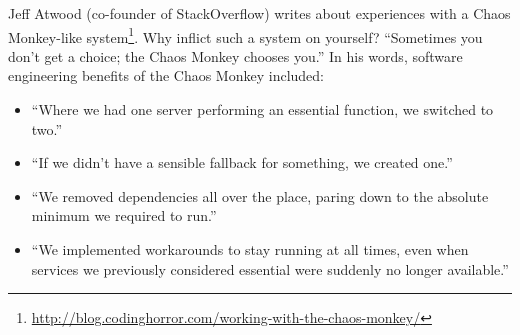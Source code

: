 \documentclass[11pt]{article}
\begin{document}
Jeff Atwood (co-founder of StackOverflow) writes about experiences with a Chaos Monkey-like system\footnote{\url{http://blog.codinghorror.com/working-with-the-chaos-monkey/}}. Why inflict such a system on yourself? ``Sometimes you don't get a choice; the Chaos Monkey chooses you.'' In his words, software engineering benefits of the Chaos Monkey included:

\begin{itemize}
\item    ``Where we had one server performing an essential function, we switched to two.''
\item    ``If we didn't have a sensible fallback for something, we created one.''
\item    ``We removed dependencies all over the place, paring down to the absolute minimum we required to run.''
\item     ``We implemented workarounds to stay running at all times, even when services we previously considered essential were suddenly no longer available.''
\end{itemize}


\end{document}
